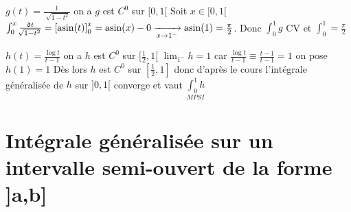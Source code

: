 \documentclass[11pt,hidelinks]{book}
\theoremstyle{mytheoremstyle}
\theoremstyle{mytheoremstyle}
\theoremstyle{mytheoremstyle}
\theoremstyle{mytheoremstyle}
\theoremstyle{mytheoremstyle}
\theoremstyle{mytheoremstyle}
\theoremstyle{mytheoremstyle}
\theoremstyle{mytheoremstyle}
\theoremstyle{myproblemstyle}
\def\mfk#1{\mathfrak{#1}}
\begin{document}
\begin{adjustwidth}{-2em}{-1em}
\begin{ex}
            $g(t) = \frac{1}{\sqrt[]{1-t^2}}$ on a $g$ est $C^0$ sur $[0,1[$
            \newline 
            Soit $x \in [0,1[$ \newline 
            $\int_{0}^{x} \frac{\mfk{d}t}{\sqrt[]{1-t^2}} = \left[\asin(t)\right]^x_0 = \asin(x) - 0 \xrightarrow[x \to 1^-]{} \asin(1) = \frac{\pi}{2}$.
            \newline 
            Donc $\int_{0}^{1} g$ CV et $\int_{0}^{1} = \frac{\pi}{2}$
        \end{ex}
        \begin{ex}
            $h(t) = \frac{\log t}{t-1}$ on a $h$ est $C^0$ sur $[\frac{1}{2}, 1[$
            \newline 
            $\lim_{1^-} h = 1$ car $\frac{\log t}{t-1} \equiv \frac{t-1}{t-1} = 1$ on pose $h(1) = 1$ 
            \newline 
            Dès lors $h$ est $C^0$ sur $\left[\frac{1}{2}, 1\right]$ donc d'après le cours l'intégrale généralisée de $h$ sur $]0,1[$ converge et vaut $\underset{MPSI}{\int_{0}^{1} h}$
        \end{ex}
    \end{adjustwidth}
   
    
    \section{Intégrale généralisée sur un intervalle semi-ouvert de la forme ]a,b]}
\end{document}
